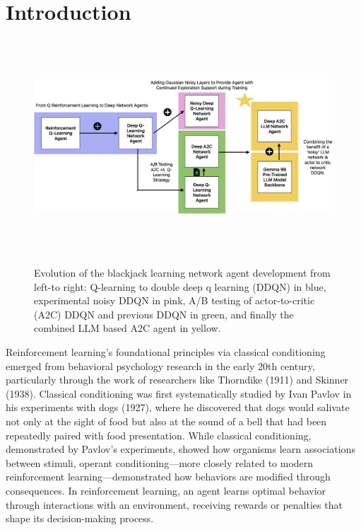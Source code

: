 \documentclass[compsoc]{IEEEtran}
\begin{document}
\maketitle
\IEEEdisplaynontitleabstractindextext


\IEEEpeerreviewmaketitle



\section{Introduction}\label{sec:introduction}

\begin{figure}[h]
\centering
{\includegraphics[width=\textwidth, height=8cm]{./fig/rl_project_architectures.png}}
\caption{Evolution of the blackjack learning network agent development from left-to right: Q-learning to double deep q learning (DDQN) in blue, experimental noisy DDQN in pink, A/B testing of actor-to-critic (A2C) DDQN and previous DDQN in green, and finally the combined LLM based A2C agent in yellow.}
\end{figure}


Reinforcement learning's foundational principles via classical conditioning emerged from behavioral psychology research in the early 20th century, particularly through the work of researchers like Thorndike (1911) and Skinner (1938). Classical conditioning was first systematically studied by Ivan Pavlov in his experiments with dogs (1927), where he discovered that dogs would salivate not only at the sight of food but also at the sound of a bell that had been repeatedly paired with food presentation. While classical conditioning, demonstrated by Pavlov's experiments, showed how organisms learn associations between stimuli, operant conditioning—more closely related to modern reinforcement learning—demonstrated how behaviors are modified through consequences. In reinforcement learning, an agent learns optimal behavior through interactions with an environment, receiving rewards or penalties that shape its decision-making process. 
\end{document}
